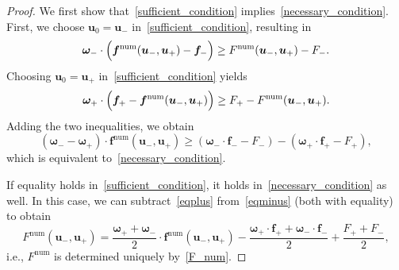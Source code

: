 \documentclass[10pt,a4paper]{amsart}
\renewcommand{\vec}[1]{\boldsymbol{#1}}
\begin{document}
\begin{proof}
We first show that~\eqref{sufficient_condition} implies~\eqref{necessary_condition}.
First, we choose  $\vec{u}_0 = \vec{u}_-$ in~\eqref{sufficient_condition}, resulting in
\begin{equation}
\vec{\omega}_- \cdot \Bigl (\vec{f}^{\mathrm{num}}(\vec{u}_-, \vec{u}_+) - \vec{f}_- \Bigr ) \geq F^{\mathrm{num}}(\vec{u}_-, \vec{u}_+) - F_-.
\label{eqminus}
\end{equation}
Choosing $\vec{u}_0 = \vec{u}_+$ in~\eqref{sufficient_condition} yields
\begin{equation}
\vec{\omega}_+ \cdot \Bigl (\vec{f}_+ - \vec{f}^{\mathrm{num}}(\vec{u}_-, \vec{u}_+) \Bigr ) \geq F_+ - F^{\mathrm{num}}(\vec{u}_-, \vec{u}_+).
\label{eqplus}
\end{equation}
Adding the two inequalities, we obtain
\begin{equation}
\left ( \vec{\omega}_- - \vec{\omega}_+ \right ) \cdot \vec{f}^{\mathrm{num}}(\vec{u}_-, \vec{u}_+) \geq \left (\vec{\omega}_- \cdot \vec{f}_- - F_- \right ) - \left (\vec{\omega}_+ \cdot \vec{f}_+ - F_+ \right ),
\end{equation}
which is equivalent to~\eqref{necessary_condition}.

If equality holds in~\eqref{sufficient_condition}, it holds in~\eqref{necessary_condition} as well.
In this case, we can subtract~\eqref{eqplus} from~\eqref{eqminus} (both with equality) to obtain
\begin{equation}
F^{\mathrm{num}}(\vec{u}_-, \vec{u}_+) = \frac{\vec{\omega}_+ + \vec{\omega}_-}{2} \cdot \vec{f}^{\mathrm{num}}(\vec{u}_-, \vec{u}_+) - \frac{\vec{\omega}_+ \cdot \vec{f}_+ + \vec{\omega}_- \cdot \vec{f}_-}{2} + \frac{F_+ + F_-}{2},
\end{equation}
i.e., $F^\mathrm{num}$ is determined uniquely by~\eqref{F_num}.


\end{proof}
\end{document}
